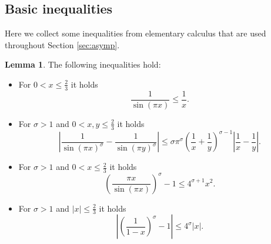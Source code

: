 \documentclass[]{interact}
\theoremstyle{definition}
\newtheorem{lem}[thm]{Lemma}
\numberwithin{table}{section} %
\numberwithin{figure}{section}
\begin{document}
\subsection{Basic inequalities}

Here we collect some inequalities from elementary calculus that are used throughout Section \ref{sec:asymp}.

\begin{lem} \label{lem:calc_ineqs}
    The following inequalities hold:
    \begin{itemize}
        \item [(i)] For $0 < x \leq \frac23$ it holds
        $$
        \frac1{\sin(\pi x)} \leq \frac{1}{x}.
        $$

        \item [(ii)] For $\sigma > 1$ and $0 < x, y \leq \frac23$ it holds
        $$
        \left|\frac1{\sin(\pi x)^\sigma} - \frac1{\sin(\pi y)^\sigma}\right| \leq \sigma \pi^\sigma \left(\frac1x + \frac1y\right)^{\sigma-1} \left|\frac1x - \frac1y\right|.
        $$

        \item [(iii)] For $\sigma > 1$ and $0 < x \leq \frac23$ it holds
        $$
        \left(\frac{\pi x}{\sin(\pi x)}\right)^{\sigma}-1 \leq  4^{\sigma+1} x^2.
        $$

        \item [(iv)] For $\sigma > 1$ and $|x| \leq \frac23$ it holds
        $$
        \left|\left(\frac1{1-x}\right)^\sigma - 1\right| \leq 4^\sigma |x|.
        $$
    \end{itemize}
\end{lem}
\end{document}
